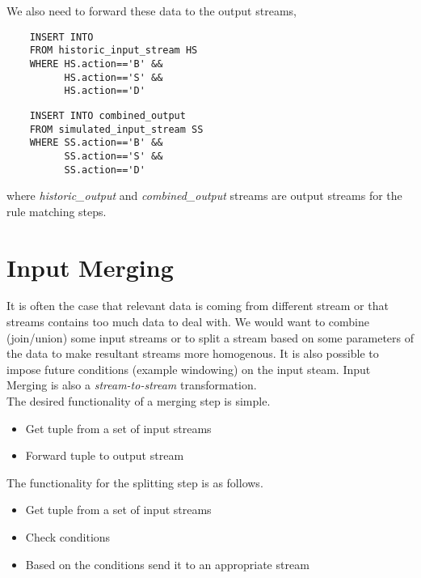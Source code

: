 \documentclass{article}
\begin{document}
\noindent We also need to forward these data to the output streams,

\begin{verbatim}   
    INSERT INTO  
    FROM historic_input_stream HS
    WHERE HS.action=='B' &&
          HS.action=='S' &&
          HS.action=='D'
\end{verbatim}

\begin{verbatim}  
    INSERT INTO combined_output
    FROM simulated_input_stream SS
    WHERE SS.action=='B' &&
          SS.action=='S' &&
          SS.action=='D'
\end{verbatim}

\noindent where \emph{historic\_output} and \emph{combined\_output} streams are output streams for the rule matching steps. 


\section{Input Merging}

It is often the case that relevant data is coming from different stream or that streams contains too much data to deal with. We would want to combine (join/union) some input streams or to split a stream based on some parameters of the data to make resultant streams more homogenous. It is also possible to impose future conditions (example windowing) on the input steam. Input Merging is also a \emph{stream-to-stream} transformation.
\\



The desired functionality of a merging step is simple.
\begin{itemize}
    \item Get tuple from a set of input streams
    \item Forward tuple to output stream
\end{itemize}

\noindent The functionality for the splitting step is as follows.

\begin{itemize}
    \item Get tuple from a set of input streams
    \item Check conditions
    \item Based on the conditions send it to an appropriate stream
\end{itemize}
\end{document}
